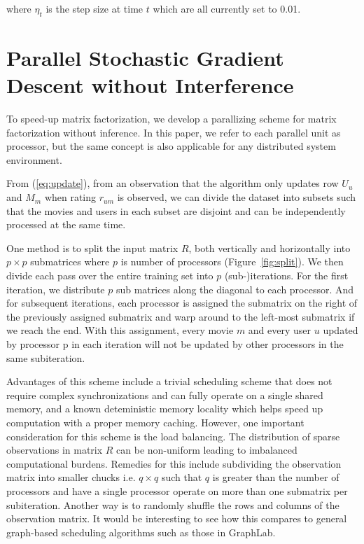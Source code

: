 \documentclass{article} %
\newcommand{\U}{U}
\begin{document}
where $\eta_t$ is the step size at time $t$ which are all currently set to 0.01.

\section{Parallel Stochastic Gradient Descent without Interference}

To speed-up matrix factorization, we develop a parallizing scheme for matrix factorization without inference.
In this paper, we refer to each parallel unit as processor, but the same concept is also applicable for any distributed system environment.

From (\ref{eq:update}), from an observation that the algorithm only updates row $\U_u$ and $M_m$ when rating $r_{um}$ is observed, we can divide the dataset into subsets such that the movies and users in each subset are disjoint and can be independently processed at the same time.

One method is to split the input matrix $R$, both vertically and horizontally
into $p \times p$ submatrices where $p$ is number of processors
(Figure~\ref{fig:split}). We then divide each pass over the entire training
set into $p$ (sub-)iterations. For the first iteration, we distribute $p$ sub
matrices along the diagonal to each processor.  And for subsequent iterations, each processor is assigned the submatrix on the right of the
previously assigned submatrix and warp around to the left-most submatrix if we reach the end. With this assignment, every movie $m$ and every user $u$ updated by processor p in each iteration will not be updated by other processors in the same subiteration.

Advantages of this scheme include a trivial scheduling scheme that does not require complex synchronizations and can fully operate on a single shared memory, and a known deteministic memory locality which helps speed up computation with a proper memory caching. However, one important consideration for this scheme is the load balancing. The distribution of sparse observations in matrix $R$ can be non-uniform leading to imbalanced computational burdens. Remedies for this include subdividing the observation matrix into smaller chucks i.e. $q \times q$ such that $q$ is greater than the number of processors and have a single processor operate on more than one submatrix per subiteration. Another way is to randomly shuffle the rows and columns of the observation matrix. It would be interesting to see how this compares to general graph-based scheduling algorithms such as those in GraphLab.
\end{document}
